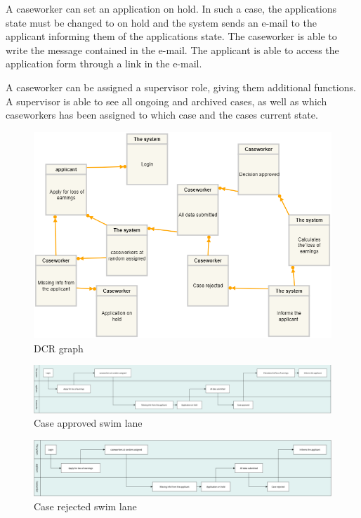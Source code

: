 A caseworker can set an application on hold. In such a case, the applications state must be changed to on hold and the system sends an e-mail to the applicant informing them of the applications state. The caseworker is able to write the message contained in the e-mail. The applicant is able to access the application form through a link in the e-mail.

\vspace{2mm}

A caseworker can be assigned a supervisor role, giving them additional functions. A supervisor is able to see all ongoing and archived cases, as well as which caseworkers has been assigned to which case and the cases current state.
\newpage
\begin{figure}[htb!]
	\includegraphics[width=\textwidth]{DCRcopy}
	\caption{DCR graph}
\end{figure}

\begin{figure}
    \centering
    \includegraphics{img/swim-case-approved.png}
    \caption{Case approved swim lane}
\end{figure}

\begin{figure}
    \centering
    \includegraphics{img/swim-case-rejected.png}
    \caption{Case rejected swim lane}
\end{figure}